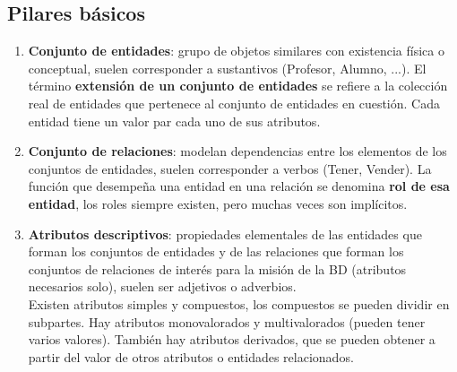 \documentclass{article}
\begin{document}
\subsection{Pilares básicos}
\begin{enumerate}
    \item \textbf{Conjunto de entidades}: grupo de objetos similares con existencia física o conceptual, suelen corresponder a sustantivos (Profesor, Alumno, ...). El término \textbf{extensión de un conjunto de entidades} se refiere a la colección real de entidades que pertenece al conjunto de entidades en cuestión. Cada entidad tiene un valor par cada uno de sus atributos.

    \item \textbf{Conjunto de relaciones}: modelan dependencias entre los elementos de los conjuntos de entidades, suelen corresponder a verbos (Tener, Vender). La función que desempeña una entidad en una relación se denomina \textbf{rol de esa entidad}, los roles siempre existen, pero muchas veces son implícitos.

    \item \textbf{Atributos descriptivos}: propiedades elementales de las entidades que forman los conjuntos de entidades y de las relaciones que forman los conjuntos de relaciones de interés para la misión de la BD (atributos necesarios solo), suelen ser adjetivos o adverbios. \\
    Existen atributos simples y compuestos, los compuestos se pueden dividir en subpartes. Hay atributos monovalorados y multivalorados (pueden tener varios valores). También hay atributos derivados, que se pueden obtener a partir del valor de otros atributos o entidades relacionados.
\end{enumerate}
\end{document}
